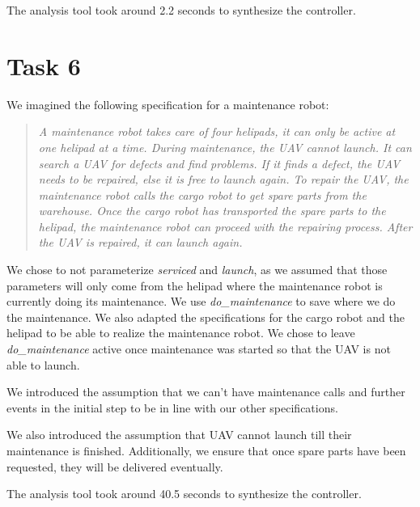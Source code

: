 \documentclass[	runningheads,
    a4paper]{llncs}
\begin{document}



    The analysis tool took around 2.2 seconds to synthesize the controller.


    \section*{Task 6}


    We imagined the following specification for a maintenance robot:

    \begin{quote}
        \textit{A maintenance robot takes care of four helipads, it can only be active at one helipad at a time.
        During maintenance, the UAV cannot launch.
        It can search a UAV for defects and find problems.
        If it finds a defect, the UAV needs to be repaired, else it is free to launch again.
        To repair the UAV, the maintenance robot calls the cargo robot to get spare parts from the warehouse.
        Once the cargo robot has transported the spare parts to the helipad, the maintenance robot can proceed with the repairing process.
        After the UAV is repaired, it can launch again.}

    \end{quote}

    We chose to not parameterize \textit{serviced} and \textit{launch}, as we assumed that those parameters will only come from the helipad where the maintenance robot is currently doing its maintenance.
    We use \textit{do\_maintenance} to save where we do the maintenance.
    We also adapted the specifications for the cargo robot and the helipad to be able to realize the maintenance robot.
    We chose to leave \textit{do\_maintenance} active once maintenance was started so that the UAV is not able to launch.


    We introduced the assumption that we can't have maintenance calls and further events in the initial step to be in line with our other specifications.

    We also introduced the assumption that UAV cannot launch till their maintenance is finished.
    Additionally, we ensure that once spare parts have been requested, they will be delivered eventually.


    The analysis tool took around 40.5 seconds to synthesize the controller.

\end{document}

